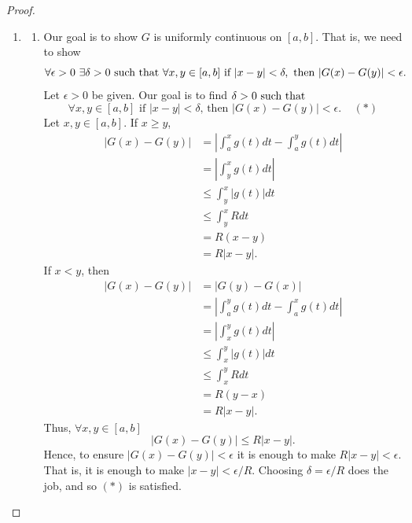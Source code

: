\begin{proof}
\begin{enumerate}
        \item \begin{enumerate}
            \item [(1)] Our goal is to show $G$ is uniformly continuous on $[a,b].$ That is, we need to show
            $$\forall \epsilon > 0 ~\exists \delta > 0 \text{ such that } \forall x,y \in [a,b] \text{ if } |x-y| < \delta, \text{ then } |G(x) - G(y)| < \epsilon.$$
            Let $\epsilon > 0$ be given. Our goal is to find $\delta > 0 \text{ such that }$
            $$\forall x,y \in [a,b] \text{ if $|x-y| < \delta$, then $|G(x) - G(y)| < \epsilon$.} ~~~~~(*)$$
            Let $x,y \in [a,b]$. If $x \geq y$,
            \begin{align*}
                |G(x) - G(y)| &= \left|\int_a^x g(t) dt - \int_a^y g(t) dt\right| \\ 
                &= \left|\int_y^x g(t)dt\right| \\ 
                &\leq \int_y^x |g(t)|dt \\ 
                &\leq \int_y^x R dt \tag{Let $R = \sup_a \leq t \leq b |g|$} \\
                &= R(x - y) \\
                &= R|x-y|.
            \end{align*}
            If $x < y$, then 
            \begin{align*}
                |G(x) - G(y)| &= |G(y) - G(x)| \\
                &= \left|\int_a^yg(t) dt - \int_a^xg(t)dt\right| \\
                &= \left|\int_x^y g(t) dt\right| \\
                &\leq \int_x^y |g(t)|dt \\
                &\leq \int_x^y R dt \\ 
                &= R(y-x) \\
                &= R|x-y|.
            \end{align*}
            Thus, $\forall x,y \in [a,b]$ 
            $$|G(x) - G(y)| \leq R|x-y|.$$
            Hence, to ensure $|G(x) - G(y)| < \epsilon$ it is enough to make $R|x-y| < \epsilon.$ That is, it is enough to make $|x-y| < \epsilon / R$. Choosing $\delta = \epsilon / R$ does the job, and so $(*)$ is satisfied.


\end{enumerate}
\end{enumerate}
\end{proof}
